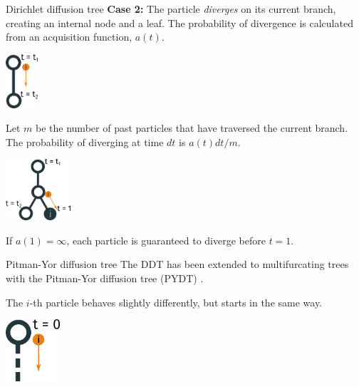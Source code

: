 \documentclass[10pt, compress]{beamer}
\begin{document}
\begin{frame}{Dirichlet diffusion tree}
  \textbf{Case 2:} 
  The particle \emph{diverges} on its current branch,
  creating an internal node and a leaf.
  The probability of divergence is calculated from
  an \alert{acquisition function}, $a(t)$.


  \begin{center}
      \includegraphics[width=0.09\textwidth]{img/ddt-4}
  \end{center}

  \pause

  Let $m$ be the number of past particles that have traversed the current branch.
  The probability of diverging at time $dt$ is $a(t)dt/m$.

  \pause

  \begin{center}
      \includegraphics[width=0.18\textwidth]{img/ddt-5}
  \end{center}

  \pause

  If $a(1) = \infty$, each particle is guaranteed to diverge before $t = 1$.

\end{frame}

\begin{frame}{Pitman-Yor diffusion tree}
  The DDT has been extended to
  multifurcating trees with the Pitman-Yor diffusion tree (PYDT) \cite{Knowles2015}.

  The $i$-th particle behaves slightly differently, but
  starts in the same way.

  \begin{center}
      \includegraphics[width=0.15\textwidth]{img/ddt-1}
  \end{center}

\end{frame}
\end{document}
